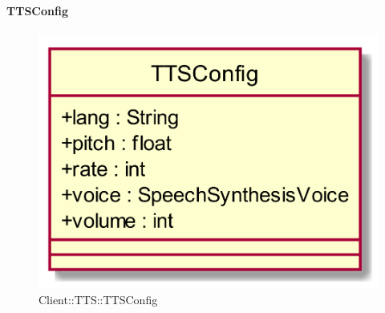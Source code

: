 \hypertarget{TTSConfig_label}{\paragraph{TTSConfig}}
\begin{figure}[h]
	\centering
	\includegraphics[width=\textwidth,height=\textheight,keepaspectratio]{images/ClassTTSConfig.png}
	\caption{Client::TTS::TTSConfig}
\end{figure}
